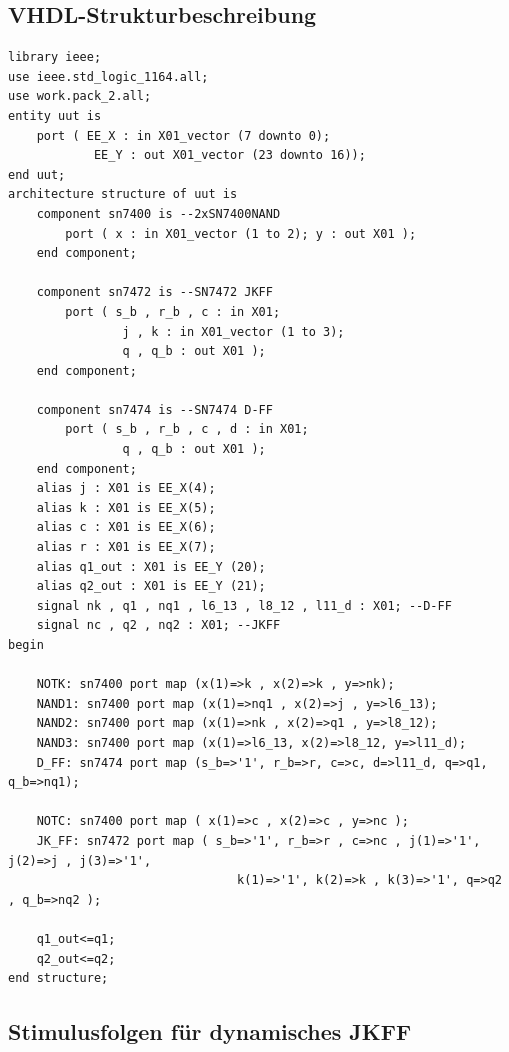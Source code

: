 \documentclass[fleqn]{article}
\begin{document}
\subsection{VHDL-Strukturbeschreibung}
\begin{lstlisting}
library ieee; 
use ieee.std_logic_1164.all; 
use work.pack_2.all; 
entity uut is 
    port ( EE_X : in X01_vector (7 downto 0);
            EE_Y : out X01_vector (23 downto 16));
end uut; 
architecture structure of uut is 
    component sn7400 is --2xSN7400NAND 
        port ( x : in X01_vector (1 to 2); y : out X01 ); 
    end component; 

    component sn7472 is --SN7472 JKFF
        port ( s_b , r_b , c : in X01; 
                j , k : in X01_vector (1 to 3); 
                q , q_b : out X01 ); 
    end component;

    component sn7474 is --SN7474 D-FF 
        port ( s_b , r_b , c , d : in X01;
                q , q_b : out X01 ); 
    end component; 
    alias j : X01 is EE_X(4); 
    alias k : X01 is EE_X(5);
    alias c : X01 is EE_X(6); 
    alias r : X01 is EE_X(7); 
    alias q1_out : X01 is EE_Y (20); 
    alias q2_out : X01 is EE_Y (21); 
    signal nk , q1 , nq1 , l6_13 , l8_12 , l11_d : X01; --D-FF 
    signal nc , q2 , nq2 : X01; --JKFF 
begin 

    NOTK: sn7400 port map (x(1)=>k , x(2)=>k , y=>nk); 
    NAND1: sn7400 port map (x(1)=>nq1 , x(2)=>j , y=>l6_13); 
    NAND2: sn7400 port map (x(1)=>nk , x(2)=>q1 , y=>l8_12); 
    NAND3: sn7400 port map (x(1)=>l6_13, x(2)=>l8_12, y=>l11_d); 
    D_FF: sn7474 port map (s_b=>'1', r_b=>r, c=>c, d=>l11_d, q=>q1, q_b=>nq1); 

    NOTC: sn7400 port map ( x(1)=>c , x(2)=>c , y=>nc );
    JK_FF: sn7472 port map ( s_b=>'1', r_b=>r , c=>nc , j(1)=>'1', j(2)=>j , j(3)=>'1', 
                                k(1)=>'1', k(2)=>k , k(3)=>'1', q=>q2 , q_b=>nq2 );

    q1_out<=q1; 
    q2_out<=q2; 
end structure;
\end{lstlisting}

\subsection{Stimulusfolgen für dynamisches JKFF}
\end{document}

